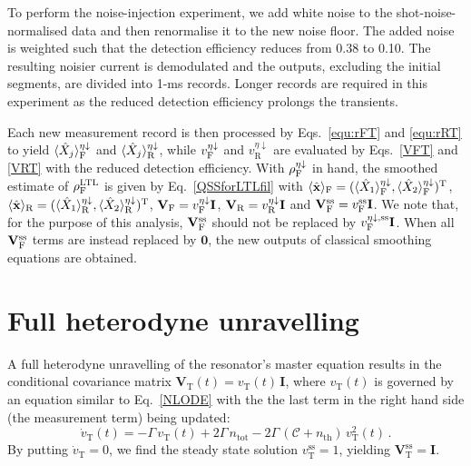 \documentclass[./Main-revtex.tex]{subfiles}
\begin{document}
To perform the noise-injection experiment, we add white noise to the shot-noise-normalised data and then renormalise it to the new noise floor. The added noise is weighted such that the detection efficiency reduces from 0.38 to 0.10. The resulting noisier current is demodulated and the outputs, excluding the initial segments, are divided into 1-ms records. Longer records are required in this experiment as the reduced detection efficiency prolongs the transients.

Each new measurement record is then processed by Eqs.~\eqref{equ:rFT} and \eqref{equ:rRT} to yield $\langle \hat{X}_j \rangle_{\text F}^{\eta\downarrow}$ and $\langle \hat{X}_j \rangle_{\text R}^{\eta\downarrow}$, while $v_{\text F}^{\eta\downarrow}$ and $v_\text{R}^{\eta\downarrow}$ are evaluated by Eqs.~\eqref{VFT} and \eqref{VRT} with the reduced detection efficiency. With $\rho_{\text F}^{\eta\downarrow}$ in hand, the smoothed estimate of $\rho_{\text F}^\text{LTL}$ is given by Eq.~\eqref{QSSforLTLfil} with $\langle \hat{\mathbf{x}} \rangle_{\text F}=(\langle \hat{X}_1 \rangle_{\text F}^{\eta\downarrow},\langle \hat{X}_2 \rangle_{\text F}^{\eta\downarrow})^\text{T}$, $\langle \hat{\mathbf{x}} \rangle_{\text R}=(\langle \hat{X}_1 \rangle_{\text R}^{\eta\downarrow},\langle \hat{X}_2 \rangle_{\text R}^{\eta\downarrow})^\text{T}$, $\mathbf{V}_{\text F}=v_{\text F}^{\eta\downarrow}\mathbf{I}$, $\mathbf{V}_{\text R}=v_{\text R}^{\eta\downarrow}\mathbf{I}$ and $\mathbf{V}_{\text F}^\text{ss}=v_{\text F}^\text{ss}\mathbf{I}$. We note that, for the purpose of this analysis, $\mathbf{V}_{\text F}^\text{ss}$ should not be replaced by $ v_{\text F}^{\eta\downarrow,\text{ss}}\mathbf{I}$. When all $\mathbf{V}_{\text F}^\text{ss}$ terms are instead replaced by $\mathbf{0}$, the new outputs of classical smoothing equations are obtained.

\section{Full heterodyne unravelling}\label{SecFullHete}

A full heterodyne unravelling of the resonator's master equation results in the conditional covariance matrix $\mathbf{V}_\text{T}(t)=v_\text{T}(t)\,\mathbf{I}$, where $v_\text{T}(t)$ is governed by an equation similar to Eq.~\eqref{NLODE} with the the last term in the right hand side (the measurement term) being updated:
\begin{equation}
     \dot{v}_\text{T}(t) = -\Gamma\,v_\text{T}(t)+2\Gamma\,n_\text{tot}-2 \Gamma\,(\mathcal{C}+n_\text{th})\,v^2_\text{T}(t)\,.
\label{TrueRiccati}
\end{equation}
By putting $\dot{v}_\text{T}=0$, we find the steady state solution $v_\text{T}^\text{ss}=1$, yielding $\mathbf{V}_\text{T}^\text{ss}=\mathbf{I}$.
\end{document}
